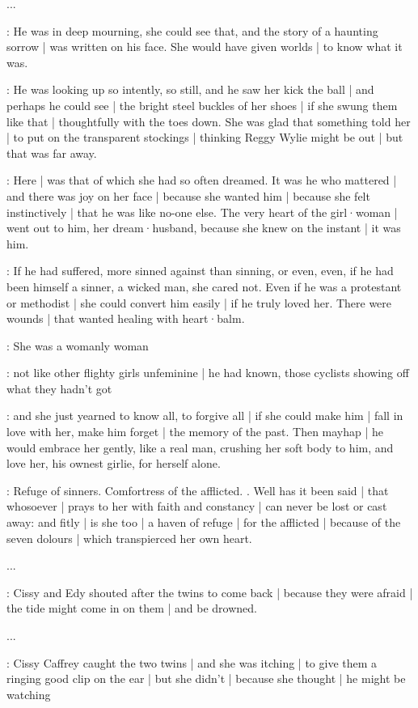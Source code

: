 ...

\gertyNovel:
He was in deep mourning,
she could see that,
and the story of a haunting sorrow |
was written on his face.
She would have given worlds |
to know what it was.

\gertySex:
He was looking up so intently,
so still,
and he saw her kick the ball |
and perhaps he could see |
the bright steel buckles of her shoes |
if she swung them like that |
thoughtfully with the toes down.
She was glad that something told her |
to put on the transparent stockings |
thinking Reggy Wylie might be out |
but that was far away.

\gertyRomantic:
Here |
was that of which she had so often dreamed.
It was he who mattered |
and there was joy on her face |
because she wanted him |
because she felt instinctively |
that he was like no-one else.%
The very heart of the girl·woman |
went out to him,
her dream·husband,
because she knew on the instant |
it was him.

\gertyNovel:
If he had suffered,
more sinned against than sinning,
or even,
even,
if he had been himself a sinner,
a wicked man,
she cared not.
Even if he was a protestant or methodist |
she could convert him easily |
if he truly loved her.
There were wounds |
that wanted healing with heart·balm.

\gertySex:
She was a womanly woman

\gertyJudgy:
not like other flighty girls unfeminine |
he had known,
those cyclists showing off what they hadn't got

\gertySex:
and she just yearned to know all,
to forgive all |
if she could make him |
fall in love with her,
make him forget |
the memory of the past.
Then mayhap |
he would embrace her gently,
like a real man,
crushing her soft body to him,%
and love her,
his ownest girlie,
for herself alone.

\Nrelig:
Refuge of sinners.
Comfortress of the afflicted.
.
Well has it been said |
that whosoever |
prays to her with faith and constancy |
can never be lost or cast away:
and fitly |
is she too |
a haven of refuge |
for the afflicted |
because of the seven dolours |
which transpierced her own heart.

...

:
Cissy and Edy shouted after the twins to come back |
because they were afraid |
the tide might come in on them |
and be drowned.

...

:
Cissy Caffrey caught the two twins |
and she was itching |
to give them a ringing good clip on the ear |
but she didn't |
because she thought |
he might be watching

